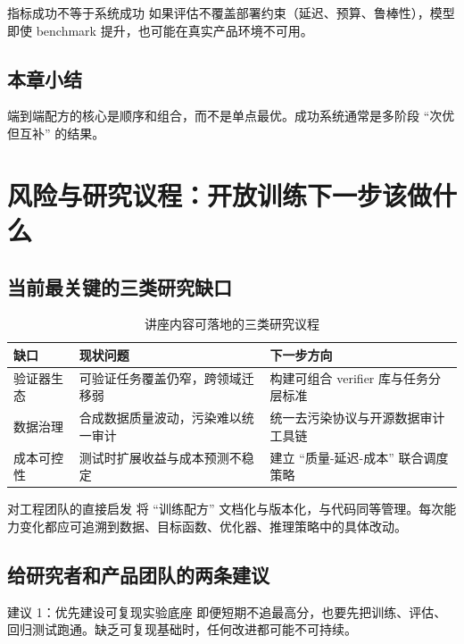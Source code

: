 \documentclass[a4paper]{article}
\begin{document}
\begin{warningbox}{指标成功不等于系统成功}
如果评估不覆盖部署约束（延迟、预算、鲁棒性），模型即使 benchmark 提升，也可能在真实产品环境不可用。
\end{warningbox}

\subsection{本章小结}
端到端配方的核心是顺序和组合，而不是单点最优。成功系统通常是多阶段 ``次优但互补'' 的结果。


\section{风险与研究议程：开放训练下一步该做什么}

\subsection{当前最关键的三类研究缺口}
\begin{table}[H]
\centering
\renewcommand{\arraystretch}{1.2}
\begin{tabular}{p{3.0cm}p{4.0cm}p{4.2cm}}
\toprule
\textbf{缺口} & \textbf{现状问题} & \textbf{下一步方向} \\
\midrule
验证器生态 & 可验证任务覆盖仍窄，跨领域迁移弱 & 构建可组合 verifier 库与任务分层标准 \\
数据治理 & 合成数据质量波动，污染难以统一审计 & 统一去污染协议与开源数据审计工具链 \\
成本可控性 & 测试时扩展收益与成本预测不稳定 & 建立 ``质量-延迟-成本'' 联合调度策略 \\
\bottomrule
\end{tabular}
\caption{讲座内容可落地的三类研究议程}
\end{table}

\begin{knowledgebox}{对工程团队的直接启发}
将 ``训练配方'' 文档化与版本化，与代码同等管理。每次能力变化都应可追溯到数据、目标函数、优化器、推理策略中的具体改动。
\end{knowledgebox}

\subsection{给研究者和产品团队的两条建议}
\begin{importantbox}{建议 1：优先建设可复现实验底座}
即便短期不追最高分，也要先把训练、评估、回归测试跑通。缺乏可复现基础时，任何改进都可能不可持续。
\end{importantbox}
\end{document}
